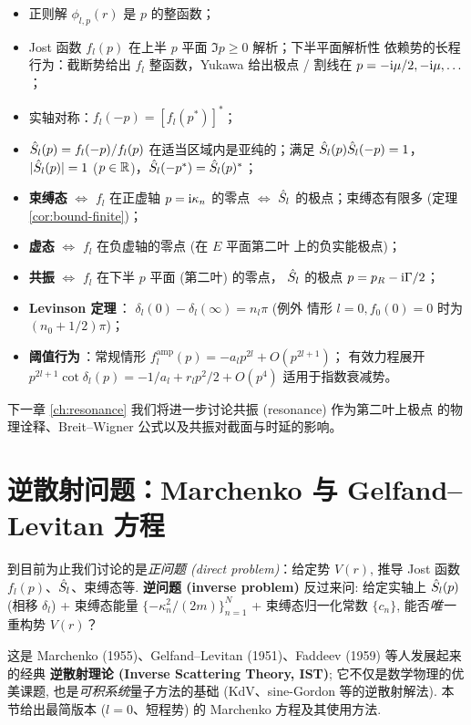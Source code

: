 \begin{itemize}
\item 正则解 $\phi_{l,p}(r)$ 是 $p$ 的整函数；
\item Jost 函数 $f_l(p)$ 在上半 $p$ 平面 $\Im p\geq 0$ 解析；下半平面解析性
依赖势的长程行为：截断势给出 $f_l$ 整函数，Yukawa 给出极点 / 割线在
$p=-\mathrm{i}\mu/2,-\mathrm{i}\mu,\ldots$；
\item 实轴对称：$f_l(-p)=[f_l(p^*)]^*$；
\item $\hat{S}_l(p)=f_l(-p)/f_l(p)$ 在适当区域内是亚纯的；满足
$\hat{S}_l(p)\hat{S}_l(-p)=1$，$|\hat{S}_l(p)|=1$ ($p\in\mathbb{R}$)，$\hat{S}_l(-p^*)=\hat{S}_l(p)^*$；
\item \textbf{束缚态} $\Leftrightarrow$ $f_l$ 在正虚轴 $p=\mathrm{i}\kappa_n$ 的零点
$\Leftrightarrow$ $\hat{S}_l$ 的极点；束缚态有限多 (定理 \ref{cor:bound-finite})；
\item \textbf{虚态} $\Leftrightarrow$ $f_l$ 在负虚轴的零点 (在 $E$ 平面第二叶
上的负实能极点)；
\item \textbf{共振} $\Leftrightarrow$ $f_l$ 在下半 $p$ 平面 (第二叶) 的零点，
$\hat{S}_l$ 的极点 $p=p_R-\mathrm{i}\Gamma/2$；
\item \textbf{Levinson 定理}\,： $\delta_l(0)-\delta_l(\infty)=n_l\pi$ (例外
情形 $l=0,f_0(0)=0$ 时为 $(n_0+1/2)\pi$)；
\item \textbf{阈值行为}\,：常规情形 $f_l^{\text{amp}}(p)=-a_l p^{2l}+O(p^{2l+1})$；
有效力程展开
$p^{2l+1}\cot\delta_l(p)=-1/a_l+r_l p^2/2+O(p^4)$ 适用于指数衰减势。
\end{itemize}

下一章 \ref{ch:resonance} 我们将进一步讨论共振 (resonance) 作为第二叶上极点
的物理诠释、Breit--Wigner 公式以及共振对截面与时延的影响。

\section{逆散射问题：Marchenko 与 Gelfand--Levitan 方程}\label{sec:anlyt-inverse}

到目前为止我们讨论的是\emph{正问题 (direct problem)}：给定势 $V(r)$, 推导 Jost 函数 $f_l(p)$、$\hat{S}_l$、束缚态等. \textbf{逆问题 (inverse problem)} 反过来问: 给定实轴上 $\hat{S}_l(p)$ (相移 $\delta_l$) + 束缚态能量 $\{-\kappa_n^2/(2m)\}_{n=1}^{N}$ + 束缚态归一化常数 $\{c_n\}$, 能否\emph{唯一}重构势 $V(r)$？

这是 Marchenko (1955)、Gelfand--Levitan (1951)、Faddeev (1959) 等人发展起来的经典 \textbf{逆散射理论 (Inverse Scattering Theory, IST)}; 它不仅是数学物理的优美课题, 也是\emph{可积系统}量子方法的基础 (KdV、sine-Gordon 等的逆散射解法). 本节给出最简版本 ($l=0$、短程势) 的 Marchenko 方程及其使用方法.

